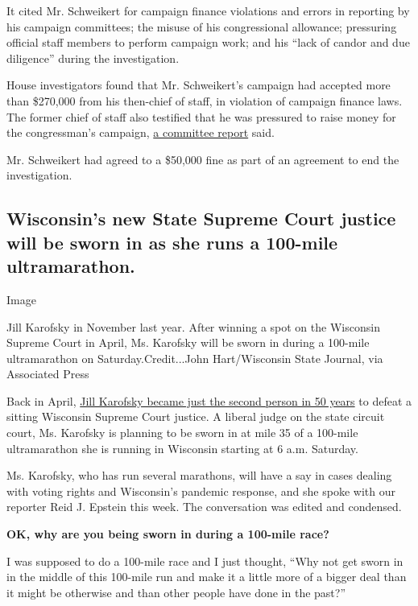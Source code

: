 It cited Mr. Schweikert for campaign finance violations and errors in
reporting by his campaign committees; the misuse of his congressional
allowance; pressuring official staff members to perform campaign work;
and his ``lack of candor and due diligence'' during the investigation.

House investigators found that Mr. Schweikert's campaign had accepted
more than \$270,000 from his then-chief of staff, in violation of
campaign finance laws. The former chief of staff also testified that he
was pressured to raise money for the congressman's campaign,
\href{https://ethics.house.gov/sites/ethics.house.gov/files/documents/Committee\%20Report_19.pdf}{a
committee report} said.

Mr. Schweikert had agreed to a \$50,000 fine as part of an agreement to
end the investigation.

\hypertarget{wisconsins-new-state-supreme-court-justice-will-be-sworn-in-as-she-runs-a-100-mile-ultramarathon}{%
\subsection{Wisconsin's new State Supreme Court justice will be sworn in
as she runs a 100-mile
ultramarathon.}\label{wisconsins-new-state-supreme-court-justice-will-be-sworn-in-as-she-runs-a-100-mile-ultramarathon}}

Image

Jill Karofsky in November last year. After winning a spot on the
Wisconsin Supreme Court in April, Ms. Karofsky will be sworn in during a
100-mile ultramarathon on Saturday.Credit...John Hart/Wisconsin State
Journal, via Associated Press

Back in April,
\href{https://www.nytimes.com/2020/04/13/us/politics/wisconsin-primary-results.html}{Jill
Karofsky became just the second person in 50 years} to defeat a sitting
Wisconsin Supreme Court justice. A liberal judge on the state circuit
court, Ms. Karofsky is planning to be sworn in at mile 35 of a 100-mile
ultramarathon she is running in Wisconsin starting at 6 a.m. Saturday.

Ms. Karofsky, who has run several marathons, will have a say in cases
dealing with voting rights and Wisconsin's pandemic response, and she
spoke with our reporter Reid J. Epstein this week. The conversation was
edited and condensed.

\textbf{OK, why are you being sworn in during a 100-mile race?}

I was supposed to do a 100-mile race and I just thought, ``Why not get
sworn in in the middle of this 100-mile run and make it a little more of
a bigger deal than it might be otherwise and than other people have done
in the past?''

